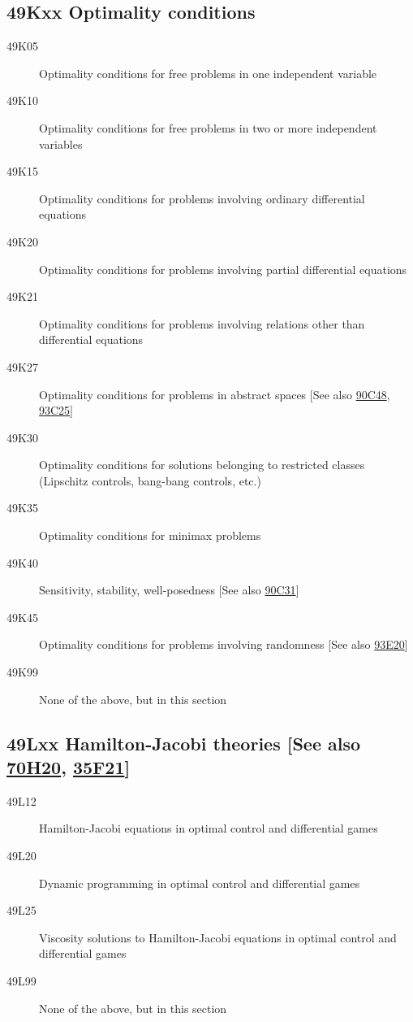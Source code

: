 \documentclass[letterpaper]{article}
\begin{document}
\subsection*{49Kxx  Optimality conditions }\label{49Kxx}
\begin{description}  
\item [49K05]\label{49K05} Optimality conditions for free problems in one independent variable
\item [49K10]\label{49K10} Optimality conditions for free problems in two or more independent variables
\item [49K15]\label{49K15} Optimality conditions for problems involving ordinary differential equations
\item [49K20]\label{49K20} Optimality conditions for problems involving partial differential equations
\item [49K21]\label{49K21} Optimality conditions for problems involving relations other than differential equations
\item [49K27]\label{49K27} Optimality conditions for problems in abstract spaces [See also \hyperref[90C48]{90C48}, \hyperref[93C25]{93C25}]
\item [49K30]\label{49K30} Optimality conditions for solutions belonging to restricted classes (Lipschitz controls, bang-bang controls, etc.)
\item [49K35]\label{49K35} Optimality conditions for minimax problems
\item [49K40]\label{49K40} Sensitivity, stability, well-posedness [See also \hyperref[90C31]{90C31}]
\item [49K45]\label{49K45} Optimality conditions for problems involving randomness [See also \hyperref[93E20]{93E20}]
\item [49K99]\label{49K99} None of the above, but in this section
\end{description}
\subsection*{49Lxx  Hamilton-Jacobi theories  [See also \hyperref[70H20]{70H20}, \hyperref[35F21]{35F21}] }\label{49Lxx}
\begin{description}  
\item [49L12]\label{49L12} Hamilton-Jacobi equations in optimal control and differential games
\item [49L20]\label{49L20} Dynamic programming in optimal control and differential games
\item [49L25]\label{49L25} Viscosity solutions to Hamilton-Jacobi equations in optimal control and differential games
\item [49L99]\label{49L99} None of the above, but in this section
\end{description}
\end{document}
